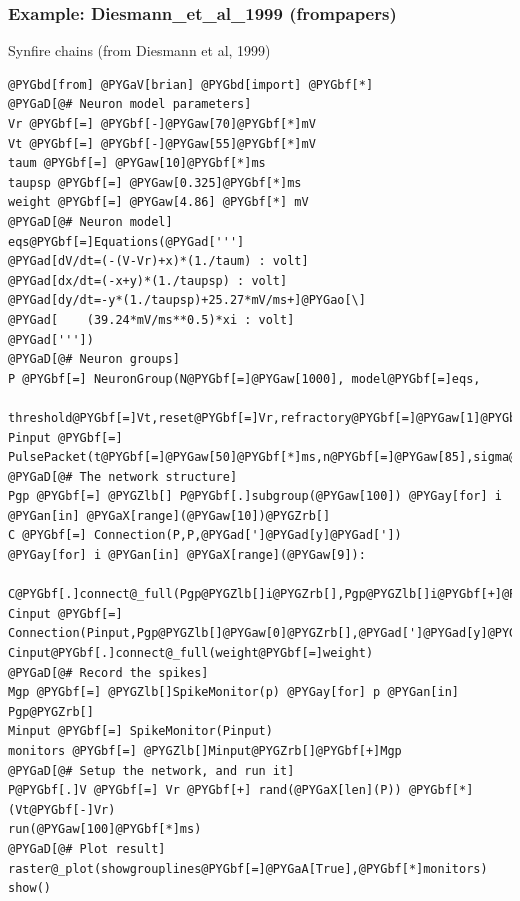 \documentclass[letterpaper,10pt,english]{manual}
\begin{document}
\resetcurrentobjects
\hypertarget{--doc-examples-frompapers_Diesmann_et_al_1999}{}

\hypertarget{index-42}{}\subsubsection{Example: Diesmann\_et\_al\_1999 (frompapers)}

Synfire chains (from Diesmann et al, 1999)

\begin{Verbatim}[commandchars=@\[\]]
@PYGbd[from] @PYGaV[brian] @PYGbd[import] @PYGbf[*]
@PYGaD[@# Neuron model parameters]
Vr @PYGbf[=] @PYGbf[-]@PYGaw[70]@PYGbf[*]mV
Vt @PYGbf[=] @PYGbf[-]@PYGaw[55]@PYGbf[*]mV
taum @PYGbf[=] @PYGaw[10]@PYGbf[*]ms
taupsp @PYGbf[=] @PYGaw[0.325]@PYGbf[*]ms
weight @PYGbf[=] @PYGaw[4.86] @PYGbf[*] mV
@PYGaD[@# Neuron model]
eqs@PYGbf[=]Equations(@PYGad[''']
@PYGad[dV/dt=(-(V-Vr)+x)*(1./taum) : volt]
@PYGad[dx/dt=(-x+y)*(1./taupsp) : volt]
@PYGad[dy/dt=-y*(1./taupsp)+25.27*mV/ms+]@PYGao[\]
@PYGad[    (39.24*mV/ms**0.5)*xi : volt]
@PYGad['''])
@PYGaD[@# Neuron groups]
P @PYGbf[=] NeuronGroup(N@PYGbf[=]@PYGaw[1000], model@PYGbf[=]eqs,
    threshold@PYGbf[=]Vt,reset@PYGbf[=]Vr,refractory@PYGbf[=]@PYGaw[1]@PYGbf[*]ms)
Pinput @PYGbf[=] PulsePacket(t@PYGbf[=]@PYGaw[50]@PYGbf[*]ms,n@PYGbf[=]@PYGaw[85],sigma@PYGbf[=]@PYGaw[1]@PYGbf[*]ms)
@PYGaD[@# The network structure]
Pgp @PYGbf[=] @PYGZlb[] P@PYGbf[.]subgroup(@PYGaw[100]) @PYGay[for] i @PYGan[in] @PYGaX[range](@PYGaw[10])@PYGZrb[]
C @PYGbf[=] Connection(P,P,@PYGad[']@PYGad[y]@PYGad['])
@PYGay[for] i @PYGan[in] @PYGaX[range](@PYGaw[9]):
    C@PYGbf[.]connect@_full(Pgp@PYGZlb[]i@PYGZrb[],Pgp@PYGZlb[]i@PYGbf[+]@PYGaw[1]@PYGZrb[],weight)
Cinput @PYGbf[=] Connection(Pinput,Pgp@PYGZlb[]@PYGaw[0]@PYGZrb[],@PYGad[']@PYGad[y]@PYGad['])
Cinput@PYGbf[.]connect@_full(weight@PYGbf[=]weight)
@PYGaD[@# Record the spikes]
Mgp @PYGbf[=] @PYGZlb[]SpikeMonitor(p) @PYGay[for] p @PYGan[in] Pgp@PYGZrb[]
Minput @PYGbf[=] SpikeMonitor(Pinput)
monitors @PYGbf[=] @PYGZlb[]Minput@PYGZrb[]@PYGbf[+]Mgp
@PYGaD[@# Setup the network, and run it]
P@PYGbf[.]V @PYGbf[=] Vr @PYGbf[+] rand(@PYGaX[len](P)) @PYGbf[*] (Vt@PYGbf[-]Vr)
run(@PYGaw[100]@PYGbf[*]ms)
@PYGaD[@# Plot result]
raster@_plot(showgrouplines@PYGbf[=]@PYGaA[True],@PYGbf[*]monitors)
show()
\end{Verbatim}
\end{document}
